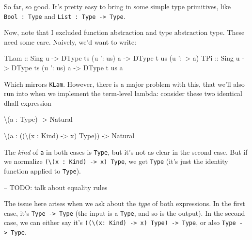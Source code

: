 \documentclass[]{article}
\newenvironment{Shaded}{}{}
\newcommand{\DataTypeTok}[1]{\textcolor[rgb]{0.56,0.13,0.00}{#1}}
\newcommand{\FunctionTok}[1]{\textcolor[rgb]{0.02,0.16,0.49}{#1}}
\newcommand{\NormalTok}[1]{#1}
\newcommand{\OtherTok}[1]{\textcolor[rgb]{0.00,0.44,0.13}{#1}}
\begin{document}
So far, so good. It's pretty easy to bring in some simple type primitives, like
\texttt{Bool\ :\ Type} and \texttt{List\ :\ Type\ -\textgreater{}\ Type}.

Now, note that I excluded function abstraction and type abstraction type. These
need some care. Naively, we'd want to write:

\begin{Shaded}
\begin{Highlighting}[]
\DataTypeTok{TLam}\OtherTok{ ::} \DataTypeTok{Sing}\NormalTok{ u }\OtherTok{->} \DataTypeTok{DType}\NormalTok{ ts (u '}\FunctionTok{:}\NormalTok{ us) a }\OtherTok{->} \DataTypeTok{DType}\NormalTok{ t us (u '}\FunctionTok{:~>}\NormalTok{ a)}
\DataTypeTok{TPi}\OtherTok{  ::} \DataTypeTok{Sing}\NormalTok{ u }\OtherTok{->} \DataTypeTok{DType}\NormalTok{ ts (u '}\FunctionTok{:}\NormalTok{ us) a }\OtherTok{->} \DataTypeTok{DType}\NormalTok{ t us a}
\end{Highlighting}
\end{Shaded}

Which mirrors \texttt{KLam}. However, there is a major problem with this, that
we'll also run into when we implement the term-level lambda: consider these two
identical dhall expression ---

\begin{Shaded}
\begin{Highlighting}[]
\NormalTok{\textbackslash{}(a }\FunctionTok{:} \DataTypeTok{Type}\NormalTok{) }\OtherTok{->} \DataTypeTok{Natural}

\NormalTok{\textbackslash{}(a }\FunctionTok{:}\NormalTok{ ((\textbackslash{}(x }\FunctionTok{:} \DataTypeTok{Kind}\NormalTok{) }\OtherTok{->}\NormalTok{ x) }\DataTypeTok{Type}\NormalTok{)) }\OtherTok{->} \DataTypeTok{Natural}
\end{Highlighting}
\end{Shaded}

The \emph{kind} of \texttt{a} in both cases is \texttt{Type}, but it's not as
clear in the second case. But if we normalize
\texttt{(\textbackslash{}(x\ :\ Kind)\ -\textgreater{}\ x)\ Type}, we get
\texttt{Type} (it's just the identity function applied to \texttt{Type}).

-- TODO: talk about equality rules

The issue here arises when we ask about the \emph{type} of both expressions. In
the first case, it's \texttt{Type\ -\textgreater{}\ Type} (the input is a
\texttt{Type}, and so is the output). In the second case, we can either say it's
\texttt{((\textbackslash{}(x:\ Kind)\ -\textgreater{}\ x)\ Type)\ -\textgreater{}\ Type},
or also \texttt{Type\ -\textgreater{}\ Type}.
\end{document}
